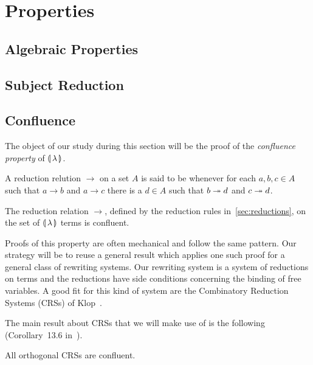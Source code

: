 \chapter{Properties}
\label{chap:properties}


\section{Algebraic Properties}
\label{sec:algebraic-properties}


\section{Subject Reduction}


\section{Confluence}

The object of our study during this section will be the proof of the
\emph{confluence property} of $\llparenthesis \, \lambda \, \rrparenthesis$.

\begin{definition}
  A reduction relution $\to$ on a set $A$ is said to be 
  whenever for each $a,b,c \in A$ such that $a \to b$ and $a \to c$ there
  is a $d \in A$ such that $b \twoheadrightarrow d$ and $c \twoheadrightarrow d$.
\end{definition}

\begin{theorem}\label{thm:confluence}
  
  The reduction relation $\to$, defined by the reduction rules
  in~\ref{sec:reductions}, on the set of $\llparenthesis \, \lambda \, \rrparenthesis$ terms is
  confluent.
\end{theorem}

Proofs of this property are often mechanical and follow the same
pattern. Our strategy will be to reuse a general result which applies one
such proof for a general class of rewriting systems. Our rewriting system
is a system of reductions on terms and the reductions have side conditions
concerning the binding of free variables. A good fit for this kind of
system are the Combinatory Reduction Systems (CRSs) of
Klop~\cite{klop1993combinatory}.

The main result about CRSs that we will make use of is the following
(Corollary~13.6 in~\cite{klop1993combinatory}).

\begin{theorem}\label{thm:confluence-crs}

  All orthogonal CRSs are confluent.
\end{theorem}


